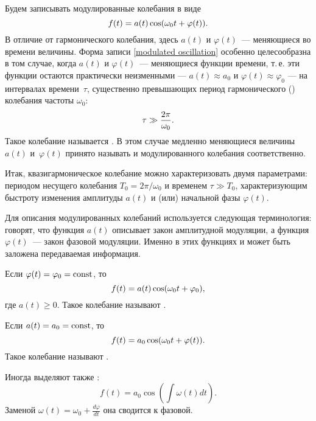 Будем записывать модулированные колебания в виде
\begin{equation}
    \eqmark{modulated oscillation}
    f(t)=a(t)\cos(\omega_0t+\varphi(t)).
\end{equation}
В отличие от гармонического колебания, здесь $a(t)$ и $\varphi(t)$~---
меняющиеся во времени величины. Форма записи \eqref{modulated oscillation}
особенно целесообразна в том случае, когда $a(t)$ и $\varphi(t)$~---
 меняющиеся функции времени, т.\,е.
эти функции остаются практически неизменными --- $a(t)\approx a_{0}$ и
$\varphi(t)\approx\varphi_0$ --- на интервалах времени~$\tau$,
существенно превышающих период гармонического ()
колебания частоты $\omega_0$:
\begin{equation}
    \eqmark{quasiharmonic oscillation - tau}
    \tau \gg \frac{2\pi}{\omega_0}.
\end{equation}
Такое колебание называется .
В этом случае медленно меняющиеся величины~$a(t)$ и~$\varphi(t)$
принято называть  и  модулированного колебания
соответственно.

Итак, квазигармоническое колебание можно характеризовать двумя параметрами:
периодом несущего колебания $T_0=2\pi/\omega_0$ и временем $\tau \gg T_0$,
характеризующим быстроту изменения амплитуды $a(t)$ и (или) начальной
фазы $\varphi(t)$.

Для описания модулированных колебаний используется
следующая терминология: говорят, что функция $a(t)$ описывает закон амплитудной
модуляции, а функция $\varphi(t)$~--- закон
фазовой модуляции. Именно в этих функциях и может быть заложена
передаваемая информация.

Если $\varphi(t)=\varphi_0=\mathrm{const}$, то
\begin{equation}
    \eqmark{amplitude-modulated}
    f(t)=a(t)\cos(\omega_0t+\varphi_0),
\end{equation}
где $a(t)\ge0$. Такое колебание называют
.

Если $a(t)=a_0=\mathrm{const}$, то
\begin{equation}
    \eqmark{phase-modulated}
    f(t)=a_0 \cos(\omega_0t+\varphi(t)).
\end{equation}
Такое колебание называют .
\begin{lab:note}
Иногда выделяют также :
    \begin{equation*}
     f(t)=a_0 \cos\left(\int\omega(t) dt\right).
    \end{equation*}
Заменой $\omega(t) = \omega_0 + \frac{d\varphi}{dt}$ она сводится
к фазовой.
\end{lab:note}

